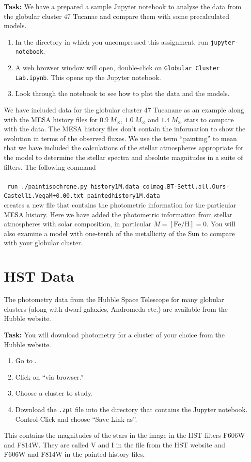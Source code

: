 \documentclass{article}
\begin{document}
\textbf{Task:} We have a prepared a sample Jupyter notebook to analyse the data from the globular cluster 47 Tucanae and compare them with some precalculated models.   
\begin{enumerate}
 \setlength\itemsep{0em}
\item
In the directory in which you uncompressed this assignment, run \texttt{jupyter-notebook}.
\item
A web browser window will open, double-click on \texttt{Globular Cluster Lab.ipynb}.  This opens up the Jupyter notebook.
\item
Look through the notebook to see how to plot the data and the models. 
\end{enumerate}
We have included data for the globular cluster 47 Tucanane as an example along with the MESA history files for  $0.9~M_\odot$, $1.0~M_\odot$ and $1.4~M_\odot$ stars to compare with the data.   The MESA history files don't contain the information to show the evolution in terms of the observed fluxes.  We use the term ``painting'' to mean that we have included the calculations of the stellar atmospheres appropriate for the model to determine the stellar spectra and absolute magnitudes in a suite of filters.  The following command \\
\\
{\small{
\texttt{
    run ./paintisochrone.py history1M.data colmag.BT-Settl.all.Ours-Castelli.VegaM+0.00.txt paintedhistory1M.data
}
}}\\
creates a new file that contains the photometric information for the particular MESA history.  Here we have added the photometric information from stellar atmospheres with solar composition, in particular $M=[\textrm{Fe/H}]=0$.  You will also examine a model with one-tenth of the metallicity of the Sun to compare with your globular cluster.

\section{HST Data}

The photometry data from the Hubble Space Telescope for many globular clusters (along with dwarf galaxies, Andromeda etc.) are available from the Hubble website.

\textbf{Task:}
You will download photometry for a cluster of your choice from the Hubble website.
\begin{enumerate}
 \setlength\itemsep{0em}
\item Go to .  
\item Click on ``via browser.''
\item Choose a cluster to study.
\item Download the \texttt{.zpt} file into the directory that contains the Jupyter notebook.  Control-Click and choose ``Save Link as''.
\end{enumerate}
This contains the magnitudes of the stars in the image in the HST filters F606W and F814W.  They are called V and I in the file from the HST website and F606W and F814W in the painted history files.
\end{document}
